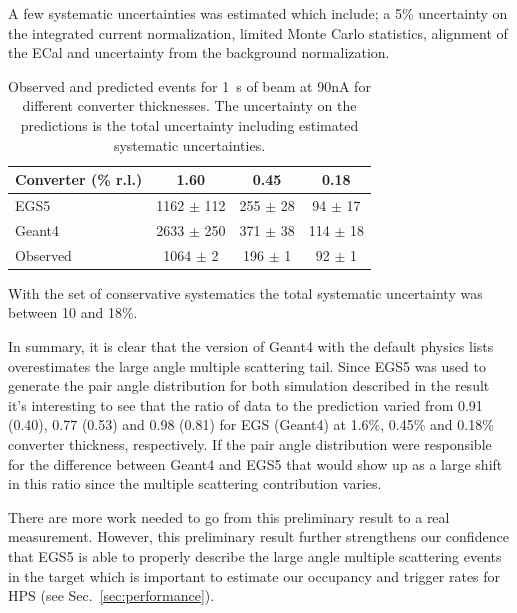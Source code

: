 A few systematic uncertainties was estimated which include; a 5\% uncertainty on the integrated 
current normalization, limited Monte Carlo statistics, alignment of the ECal and uncertainty 
from the background normalization. 
\begin{table}
\begin{tabular}{|l|c|c|c|}
\hline
Converter (\% r.l.) & 1.60 & 0.45 &	0.18 \\
\hline
{\sc EGS5} &	1162 $\pm$ 112 &	255 $\pm$ 28 &	94 $\pm$ 17	\\
\hline
{\sc Geant4} & 2633 $\pm$ 250 & 	371 $\pm$ 38 &	114 $\pm$ 18 \\
\hline
Observed 	& 1064 $\pm$ 2 & 196 $\pm$ 1 &	92 $\pm$ 1 \\						
%						
\hline
\end{tabular}
\caption{ {\small Observed and predicted events for 1~s of beam at 90nA for different converter 
thicknesses. The uncertainty on the predictions is the total uncertainty including estimated 
systematic uncertainties. }}
\end{table}
With the set of conservative systematics the total systematic uncertainty was between 10 and 18\%. 

In summary, it is clear that the version of  
{\sc Geant4} with the default physics lists overestimates the large angle multiple scattering tail. 
Since {\sc EGS5} was used to generate the pair 
angle distribution for both simulation described in the result it's interesting to see that the 
ratio of data to the prediction varied from 0.91 (0.40), 0.77 (0.53) and 0.98 (0.81) for {\sc EGS} 
({\sc Geant4}) at 1.6\%, 0.45\% and 0.18\% converter thickness, respectively. If the pair angle 
distribution were responsible for the difference between {\sc Geant4}  and {\sc EGS5} that would show up as a large shift in this ratio since the multiple scattering contribution varies. 

There are more work needed to go from this preliminary result to a real 
measurement. However, this preliminary result further strengthens our confidence that 
{\sc EGS5} is able to properly describe the large angle multiple scattering events in the target 
which is important to estimate our occupancy and trigger rates for HPS (see Sec.~\ref{sec:performance}).
